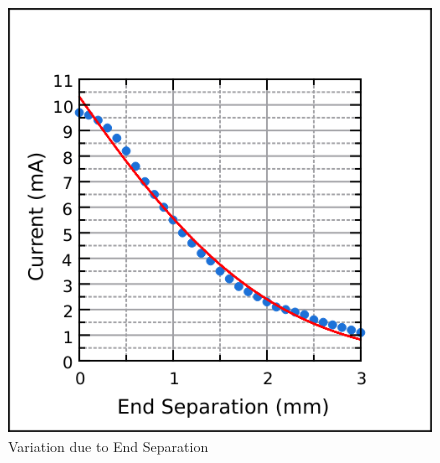     \begin{figure}
        \centering
        \includegraphics[width = 10 cm]{chapters/ES.png}
        \caption{Variation due to End Separation}
    \end{figure}

